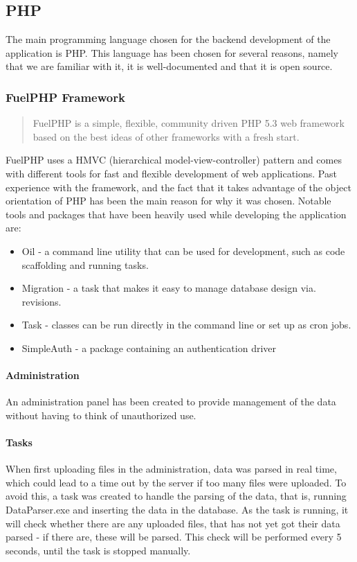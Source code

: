 \subsection{PHP}
\label{sec:php}
The main programming language chosen for the backend development of the application is PHP. This language has been chosen for several reasons, namely that we are familiar with it, it is well-documented and that it is open source.

\subsubsection{FuelPHP Framework}
\label{sec:fuelphp_framework}
\begin{quote}
FuelPHP is a simple, flexible, community driven PHP 5.3 web framework based on the best ideas of other frameworks with a fresh start\cite{FuelPHP}.
\end{quote}


FuelPHP uses a HMVC (hierarchical model-view-controller) pattern and comes with different tools for fast and flexible development of web applications. Past experience with the framework, and the fact that it takes advantage of the object orientation of PHP has been the main reason for why it was chosen. Notable tools and packages that have been heavily used while developing the application are:

\begin{itemize}
\item Oil - a command line utility that can be used for development, such as code scaffolding and running tasks. 
\item Migration - a task that makes it easy to manage database design via. revisions.
\item Task - classes can be run directly in the command line or set up as cron jobs.
\item SimpleAuth - a package containing an authentication driver
\end{itemize}

\paragraph{Administration}
\label{sec:administration}
An administration panel has been created to provide management of the data without having to think of unauthorized use. 

\paragraph{Tasks}
\label{sec:tasks}
When first uploading files in the administration, data was parsed in real time, which could lead to a time out by the server if too many files were uploaded. To avoid this, a task was created to handle the parsing of the data, that is, running DataParser.exe and inserting the data in the database. As the task is running, it will check whether there are any uploaded files, that has not yet got their data parsed - if there are, these will be parsed. This check will be performed every 5 seconds, until the task is stopped manually.

